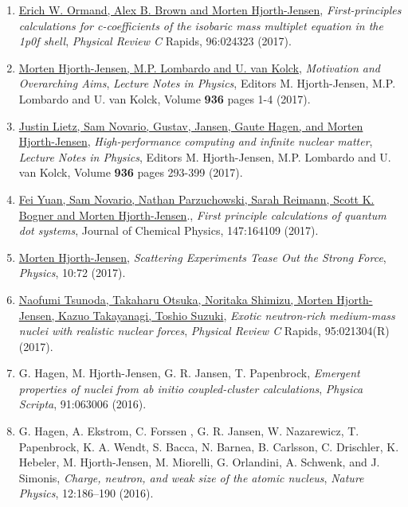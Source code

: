 \documentclass[%
oneside,                 %
final,                   %
10pt]{article}
\begin{document}
\begin{enumerate}
\item \href{{https://journals.aps.org/prc/abstract/10.1103/PhysRevC.96.024323}}{Erich W. Ormand, Alex B. Brown and Morten Hjorth-Jensen}, \emph{First-principles calculations for c-coefficients of the isobaric mass multiplet equation in the 1p0f shell}, \emph{Physical Review C} Rapids, 96:024323 (2017). 

\item \href{{http://www.springer.com/us/book/9783319533353}}{Morten Hjorth-Jensen, M.P. Lombardo and U. van Kolck}, \emph{Motivation and Overarching Aims}, \emph{Lecture Notes in Physics}, Editors M. Hjorth-Jensen, M.P. Lombardo and U. van Kolck, Volume \textbf{936} pages 1-4 (2017).

\item \href{{http://www.springer.com/us/book/9783319533353}}{Justin Lietz, Sam Novario, Gustav, Jansen, Gaute Hagen, and Morten Hjorth-Jensen}, \emph{High-performance computing and infinite nuclear matter}, \emph{Lecture Notes in Physics}, Editors M. Hjorth-Jensen, M.P. Lombardo and U. van Kolck, Volume \textbf{936} pages 293-399 (2017).

\item \href{{http://aip.scitation.org/doi/abs/10.1063/1.4995615}}{Fei Yuan, Sam Novario, Nathan Parzuchowski, Sarah Reimann, Scott K. Bogner and Morten Hjorth-Jensen}.,   \emph{First principle calculations of quantum dot systems}, Journal of Chemical Physics, 147:164109 (2017).

\item \href{{https://physics.aps.org/articles/v10/72}}{Morten Hjorth-Jensen}, \emph{Scattering Experiments Tease Out the Strong Force}, \emph{Physics}, 10:72 (2017).

\item \href{{https://journals.aps.org/prc/abstract/10.1103/PhysRevC.95.021304}}{Naofumi Tsunoda, Takaharu Otsuka, Noritaka Shimizu, Morten Hjorth-Jensen, Kazuo Takayanagi, Toshio Suzuki}, \emph{Exotic neutron-rich medium-mass nuclei with realistic nuclear forces}, \emph{Physical Review C} Rapids, 95:021304(R) (2017).

\item G. Hagen, M. Hjorth-Jensen, G. R. Jansen, T. Papenbrock, \emph{Emergent properties of nuclei from ab initio coupled-cluster calculations}, \emph{Physica Scripta}, 91:063006 (2016).

\item G. Hagen, A. Ekstrom, C. Forssen , G. R. Jansen, W. Nazarewicz, T. Papenbrock, K. A. Wendt, S. Bacca, N. Barnea, B. Carlsson, C. Drischler, K. Hebeler, M. Hjorth-Jensen, M. Miorelli, G. Orlandini, A. Schwenk, and J. Simonis,  \emph{Charge, neutron, and weak size of the atomic nucleus},  \emph{Nature Physics}, 12:186–190 (2016).


\end{enumerate}
\end{document}
